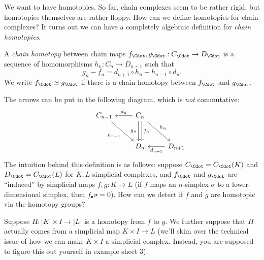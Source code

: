 \documentclass[a4paper]{article}
\begin{document}
We want to have homotopies. So far, chain complexes seem to be rather rigid, but homotopies themselves are rather floppy. How can we define homotopies for chain complexes? It turns out we can have a completely algebraic definition for \emph{chain homotopies}.

\begin{defi}
  A \emph{chain homotopy} between chain maps $f_{\Cdot}, g_{\Cdot}: C_{\Cdot} \to D_{\Cdot}$ is a sequence of homomorphisms $h_n: C_n \to D_{n + 1}$ such that
  \[
    g_n - f_n = d_{n + 1} \circ h_n + h_{n - 1} \circ d_n.
  \]
  We write $f_{\Cdot} \simeq g_{\Cdot}$ if there is a chain homotopy between $f_{\Cdot}$ and $g_{\Cdot}$.
\end{defi}
The arrows can be put in the following diagram, which is \emph{not} commutative:
\[
  \begin{tikzcd}[row sep=large]
    & C_{n - 1} \ar[rd, "h_{n - 1}"'] & C_n \ar [l, "d_n"'] \ar[d, shift left, "f_n"] \ar[d, shift right, "g_n"'] \ar [rd, "h_n"]\\
    & & D_n & D_{n + 1} \ar [l, "d_{n + 1}"]
  \end{tikzcd}
\]
The intuition behind this definition is as follows: suppose $C_{\Cdot} = C_{\Cdot} (K)$ and $D_{\Cdot} = C_{\Cdot}(L)$ for $K, L$ simplicial complexes, and $f_{\Cdot}$ and $g_{\Cdot}$ are ``induced'' by simplicial maps $f, g: K \to L$ (if $f$ maps an $n$-simplex $\sigma$ to a lower-dimensional simplex, then $f_\bullet \sigma = 0$). How can we detect if $f$ and $g$ are homotopic via the homotopy groups?

Suppose $H: |K| \times I \to |L|$ is a homotopy from $f$ to $g$. We further suppose that $H$ actually comes from a simplicial map $K \times I \to L$ (we'll skim over the technical issue of how we can make $K \times I$ a simplicial complex. Instead, you are supposed to figure this out yourself in example sheet 3).
\end{document}
